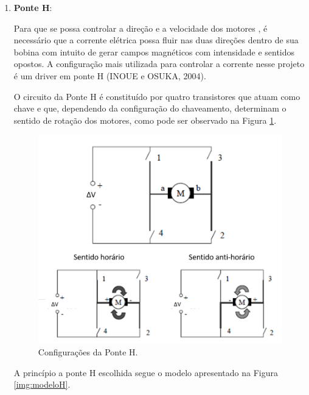 			\begin{enumerate}
				\item \textbf{Ponte H}:

					Para que se possa controlar a direção e a velocidade dos motores , é necessário que a corrente elétrica possa fluir nas duas direções dentro de sua bobina com intuito de gerar campos magnéticos com intensidade e sentidos opostos. A configuração mais utilizada para controlar a corrente nesse projeto é um driver em ponte H (INOUE e OSUKA, 2004).

					O circuito da Ponte H é constituído por quatro transistores que atuam como chave e que, dependendo da configuração do chaveamento, determinam o sentido de rotação dos motores, como pode ser observado na Figura \ref{img:configH}.

					\begin{figure}[H]
						\centering
						\includegraphics[scale=0.3]{figuras/configH.png}
						\caption{Configurações da Ponte H.}
						\label{img:configH}
					\end{figure}

					A princípio a ponte H escolhida segue o modelo apresentado na Figura \ref{img:modeloH}. 


\end{enumerate}
